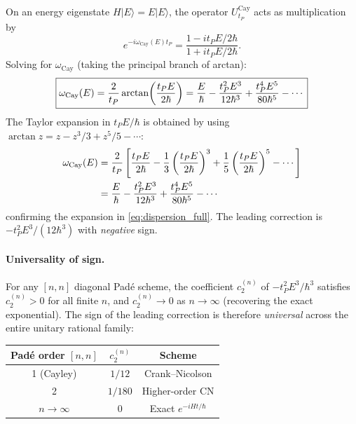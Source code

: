 \documentclass[12pt,a4paper]{article}
\begin{document}
On an energy eigenstate $H|E\rangle = E|E\rangle$, the operator $U_{t_P}^{\mathrm{Cay}}$
acts as multiplication by
\begin{equation}
  e^{-i\omega_{\mathrm{Cay}}(E) t_P} = \frac{1 - it_P E/2\hbar}{1 + it_P E/2\hbar}.
  \label{eq:cayley_eigenvalue}
\end{equation}
Solving for $\omega_{\mathrm{Cay}}$ (taking the principal branch of arctan):
\begin{equation}
  \boxed{%
  \omega_{\mathrm{Cay}}(E) = \frac{2}{t_P}\arctan\!\left(\frac{t_P E}{2\hbar}\right)
  = \frac{E}{\hbar}
  - \frac{t_P^2 E^3}{12\hbar^3}
  + \frac{t_P^4 E^5}{80\hbar^5}
  - \cdots
  }
  \label{eq:dispersion_full}
\end{equation}
The Taylor expansion in $t_P E/\hbar$ is obtained by using $\arctan z = z - z^3/3 + z^5/5 - \cdots$:
\begin{align}
  \omega_{\mathrm{Cay}}(E)
  &= \frac{2}{t_P}\left[\frac{t_P E}{2\hbar}
     - \frac{1}{3}\left(\frac{t_P E}{2\hbar}\right)^3
     + \frac{1}{5}\left(\frac{t_P E}{2\hbar}\right)^5 - \cdots\right]
  \notag \\
  &= \frac{E}{\hbar}
  - \frac{t_P^2 E^3}{12\hbar^3}
  + \frac{t_P^4 E^5}{80\hbar^5} - \cdots
  \label{eq:dispersion_expansion}
\end{align}
confirming the expansion in \eqref{eq:dispersion_full}.  The leading correction is
$-t_P^2 E^3/(12\hbar^3)$ with \emph{negative} sign.

\paragraph{Universality of sign.}
For any $[n,n]$ diagonal Pad\'e scheme, the coefficient $c_2^{(n)}$ of $-t_P^2 E^3/\hbar^3$
satisfies $c_2^{(n)} > 0$ for all finite $n$, and $c_2^{(n)} \to 0$ as $n \to \infty$
(recovering the exact exponential).  The sign of the leading correction is therefore
\emph{universal} across the entire unitary rational family:

\begin{center}
\renewcommand{\arraystretch}{1.3}
\begin{tabular}{ccc}
\toprule
Pad\'e order $[n,n]$ & $c_2^{(n)}$ & Scheme \\
\midrule
1 (Cayley) & $1/12$ & Crank--Nicolson \\
2 & $1/180$ & Higher-order CN \\
$n \to \infty$ & $0$ & Exact $e^{-iHt/\hbar}$ \\
\bottomrule
\end{tabular}
\end{center}
\end{document}
